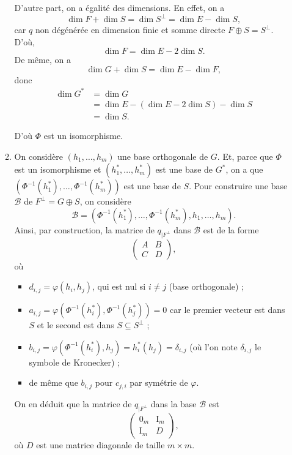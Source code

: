 \documentclass{../../td}
\begin{document}
\begin{enumerate}
\begin{enumerate}
          D'autre part, on a égalité des dimensions.
          En effet, on a \[
          \dim F + \dim S = \dim S^{\perp} = \dim E - \dim S
          ,\] car $q$ non dégénérée en dimension finie et somme directe $F \oplus S = S^\perp$.
          D'où,  \[
          \dim F = \dim E - 2 \dim S
          .\]
          De même, on a \[
          \dim G + \dim S = \dim E - \dim F
          ,\] donc
          \begin{align*}
            \dim G^* &= \dim G\\
                     &= \dim E - (\dim E - 2 \dim S) - \dim S\\
                     &= \dim S
          .\end{align*}

          D'où $\Phi$ est un isomorphisme.

        \item On considère  $(h_1, \ldots, h_m)$ une base orthogonale de $G$.
          Et, parce que $\Phi$ est un isomorphisme et  $(h_1^*, \ldots, h_m^*)$ est une base de $G^*$, on a que  $(\Phi^{-1}(h_1^*), \ldots, \Phi^{-1}(h_m^*))$ est une base de $S$.
          Pour construire une base $\mathcal{B}$ de $F^\perp = G \oplus S$, on considère  \[
          \mathcal{B} = (\Phi ^{-1}(h_1^*), \ldots, \Phi ^{-1}(h_m^*), h_1, \ldots, h_m)
          .\]
          Ainsi, par construction, la matrice de $q_{|F^\perp}$ dans $\mathcal{B}$ est de la forme \[
          \begin{pmatrix}
            A & B\\
            C & D
          \end{pmatrix} 
          ,\]
          où 
          \begin{itemize}
            \item $d_{i,j} = \varphi(h_i,h_j)$, qui est nul si $i \neq j$ (base orthogonale) ;
            \item $a_{i,j} = \varphi(\Phi ^{-1}(h_i^*), \Phi ^{-1}(h_j^*)) = 0$ car le premier vecteur est dans~$S$ et le second est dans $S\subseteq S^\perp$ ;
            \item $b_{i,j} = \varphi(\Phi ^{-1}(h_i^*), h_j) = h_i^*(h_j) = \delta_{i,j}$ (où l'on note $\delta_{i,j}$ le symbole de Kronecker) ;
            \item de même que $b_{i,j}$ pour $c_{j,i}$ par symétrie de $\varphi$.
          \end{itemize}
          On en déduit que la matrice de $q_{|F^\perp}$ dans la base $\mathcal{B}$ est \[
            \begin{pmatrix} 0_m & \mathrm{I}_m\\ \mathrm{I}_m & D \end{pmatrix} 
          ,\] où $D$ est une matrice diagonale de taille $m \times m$.


\end{enumerate}
\end{enumerate}
\end{document}
